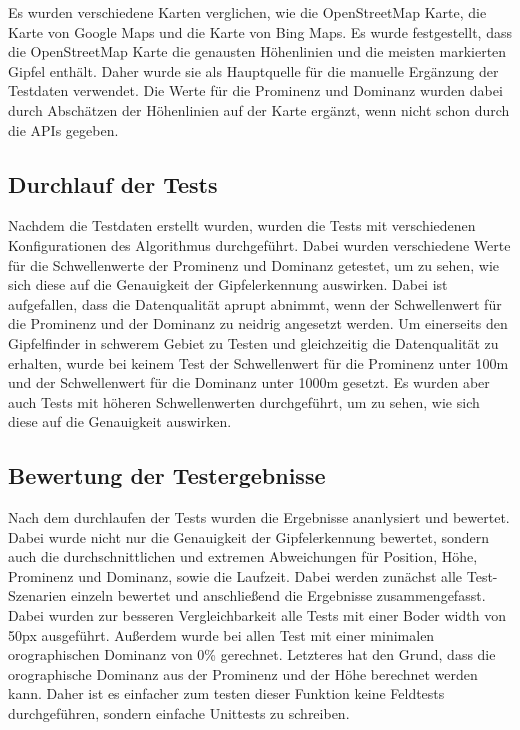 Es wurden verschiedene Karten verglichen, wie die OpenStreetMap Karte, die Karte von Google Maps und die Karte von Bing Maps. Es wurde festgestellt, dass die OpenStreetMap Karte die genausten Höhenlinien und die meisten markierten Gipfel enthält. Daher wurde sie als Hauptquelle für die manuelle Ergänzung der Testdaten verwendet. Die Werte für die Prominenz und Dominanz wurden dabei durch Abschätzen der Höhenlinien auf der Karte ergänzt, wenn nicht schon durch die APIs gegeben.

\subsection{Durchlauf der Tests}
Nachdem die Testdaten erstellt wurden, wurden die Tests mit verschiedenen Konfigurationen des Algorithmus durchgeführt. Dabei wurden verschiedene Werte für die Schwellenwerte der Prominenz und Dominanz getestet, um zu sehen, wie sich diese auf die Genauigkeit der Gipfelerkennung auswirken. Dabei ist aufgefallen, dass die Datenqualität aprupt abnimmt, wenn der Schwellenwert für die Prominenz und der Dominanz zu neidrig angesetzt werden. Um einerseits den Gipfelfinder in schwerem Gebiet zu Testen und gleichzeitig die Datenqualität zu erhalten, wurde bei keinem Test der Schwellenwert für die Prominenz unter 100m und der Schwellenwert für die Dominanz unter 1000m gesetzt. Es wurden aber auch Tests mit höheren Schwellenwerten durchgeführt, um zu sehen, wie sich diese auf die Genauigkeit auswirken.


\subsection{Bewertung der Testergebnisse}
Nach dem durchlaufen der Tests wurden die Ergebnisse ananlysiert und bewertet. Dabei wurde nicht nur die Genauigkeit der Gipfelerkennung bewertet, sondern auch die durchschnittlichen und extremen Abweichungen für Position, Höhe, Prominenz und Dominanz, sowie die Laufzeit. Dabei werden zunächst alle Test-Szenarien einzeln bewertet und anschließend die Ergebnisse zusammengefasst. Dabei wurden zur besseren Vergleichbarkeit alle Tests mit einer Boder width von 50px ausgeführt.  Außerdem wurde bei allen Test mit einer minimalen orographischen Dominanz von 0\% gerechnet. Letzteres hat den Grund, dass die orographische Dominanz aus der Prominenz und der Höhe berechnet werden kann. Daher ist es einfacher zum testen dieser Funktion keine Feldtests durchgeführen, sondern einfache Unittests zu schreiben. 

